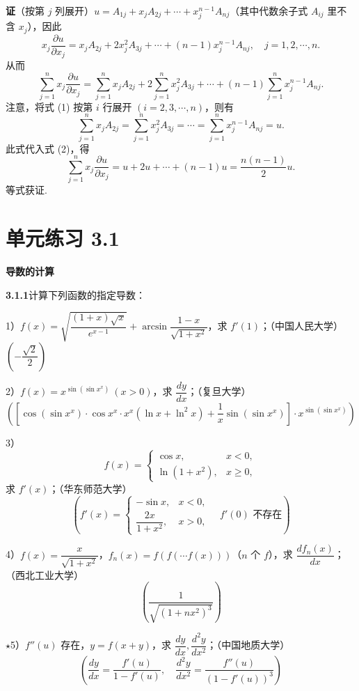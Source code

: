 \documentclass[UTF8,12pt,a4paper,fontset=fandol]{ctexart}
\begin{document}
\noindent\textbf{证}\quad （按第 $j$ 列展开）$u=A_{1j}+x_jA_{2j}+\cdots+x_j^{n-1}A_{nj}$（其中代数余子式 $A_{ij}$ 里不含 $x_j$），因此
\[
  x_j\frac{\partial u}{\partial x_j}
  =x_jA_{2j}+2x_j^2A_{3j}+\cdots+(n-1)x_j^{n-1}A_{nj},\quad j=1,2,\cdots,n.
\]
从而
\begin{equation}
  \sum_{j=1}^n x_j\frac{\partial u}{\partial x_j}
  =\sum_{j=1}^n x_jA_{2j}
  +2\sum_{j=1}^n x_j^2A_{3j}
  +\cdots+(n-1)\sum_{j=1}^n x_j^{n-1}A_{nj}.
\tag{2}
\end{equation}
注意，将式 (1) 按第 $i$ 行展开 $(i=2,3,\cdots,n)$，则有
\[
  \sum_{j=1}^n x_jA_{2j}
  =\sum_{j=1}^n x_j^2A_{3j}
  =\cdots=\sum_{j=1}^n x_j^{n-1}A_{nj}=u.
\]
此式代入式 (2)，得
\[
  \sum_{j=1}^n x_j\frac{\partial u}{\partial x_j}
  =u+2u+\cdots+(n-1)u=\frac{n(n-1)}2u.
\]
等式获证.

\section*{单元练习 3.1}

\noindent\textbf{导数的计算}

\noindent\textbf{3.1.1}\quad 计算下列函数的指定导数：

1）$f(x)=\sqrt{\dfrac{(1+x)\sqrt{x}}{e^{x-1}}}+\arcsin\dfrac{1-x}{\sqrt{1+x^2}}$，求 $f'(1)$；（中国人民大学）\quad $\left(-\dfrac{\sqrt2}{2}\right)$

2）$f(x)=x^{\sin(\sin x^x)}\ (x>0)$，求 $\dfrac{dy}{dx}$；（复旦大学）
\[
  \left(\left[\cos(\sin x^x)\cdot\cos x^x\cdot x^x(\ln x+\ln^2x)
  +\frac1x\sin(\sin x^x)\right]\cdot x^{\sin(\sin x^x)}\right)
\]

3）
\[
f(x)=
\begin{cases}
\cos x, & x<0,\\
\ln(1+x^2), & x\ge0,
\end{cases}
\]
求 $f'(x)$；（华东师范大学）
\[
\left(f'(x)=
\begin{cases}
-\sin x, & x<0,\\
\dfrac{2x}{1+x^2}, & x>0,
\end{cases}
\quad f'(0)\text{ 不存在}\right)
\]

4）$f(x)=\dfrac{x}{\sqrt{1+x^2}}$，$f_n(x)=f(f(\cdots f(x)))$（$n$ 个 $f$），求 $\dfrac{df_n(x)}{dx}$；（西北工业大学）
\[
  \left(\frac1{\sqrt{(1+nx^2)^3}}\right)
\]

$\star$5）$f''(u)$ 存在，$y=f(x+y)$，求 $\dfrac{dy}{dx},\dfrac{d^2y}{dx^2}$；（中国地质大学）
\[
  \left(\frac{dy}{dx}=\frac{f'(u)}{1-f'(u)},\quad
  \frac{d^2y}{dx^2}=\frac{f''(u)}{(1-f'(u))^3}\right)
\]
\end{document}
